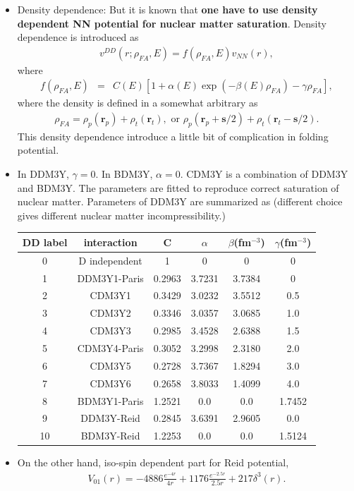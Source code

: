 \documentclass[11pt]{book}
\def\bm{\boldsymbol}
\def\vr{{\bm r}}
\newcommand{\bea}{\begin{eqnarray}}
\newcommand{\eea}{\end{eqnarray}}
\begin{document}
\begin{itemize}
	\item Density dependence: But it is known that {\bf one have to use density dependent NN potential for nuclear matter saturation}.
	Density dependence is introduced as 
	\bea 
	v^{DD}(r;\rho_{FA},E)= f(\rho_{FA},E) v_{NN}(r),
	\eea 
	where
	\bea 
	f(\rho_{FA},E)&=& C(E) \left[ 1+\alpha(E) \exp(-\beta(E) \rho_{FA})-\gamma \rho_{FA} \right],
	\eea  
	where the density is defined in a somewhat arbitrary as
	\bea 
	\rho_{FA} = \rho_{p}(\vr_p)+\rho_t(\vr_t),\mbox{ or } \rho_{p}(\vr_p+{\bm s}/2)+\rho_t(\vr_t-{\bm s}/2).
	\eea 
	This density dependence introduce a little bit of complication in folding potential. 
	\item In DDM3Y, $\gamma=0$. In BDM3Y, $\alpha=0$. CDM3Y is a combination of DDM3Y and BDM3Y. 
	 The parameters are fitted to reproduce correct saturation of nuclear matter. 
     Parameters of DDM3Y are summarized as (different choice gives different nuclear matter incompressibility.)
    
    \begin{tabular}{|c|c|c|c|c|c|}
    	\hline 
    	DD label & interaction & C & $\alpha$ & $\beta$(fm$^{-3}$) & $\gamma$(fm$^{-3}$) \\ 
    	\hline 
    	0 & D independent & 1 & 0 & 0 & 0 \\ 
    	\hline 
    	1 & DDM3Y1-Paris & 0.2963 & 3.7231 & 3.7384 & 0 \\ 
    	\hline 
    	2 & CDM3Y1 & 0.3429 & 3.0232 &  3.5512 &  0.5 \\ 
    	\hline 
    	3 & CDM3Y2 &  0.3346  & 3.0357  & 3.0685 &  1.0 \\ 
    	\hline 
    	4 & CDM3Y3 &  0.2985  & 3.4528  & 2.6388 &  1.5 \\ 
    	\hline 
    	5 & CDM3Y4-Paris &  0.3052  & 3.2998  & 2.3180 &  2.0 \\ 
    	\hline 
    	6 & CDM3Y5 &  0.2728  & 3.7367 &  1.8294 &  3.0 \\ 
    	\hline 
    	7 & CDM3Y6 &  0.2658  & 3.8033 &  1.4099  & 4.0 \\ 
    	\hline 
    	8 & BDM3Y1-Paris &  1.2521 &  0.0 &  0.0  & 1.7452
    	\\ 
    	\hline 
    	9 &DDM3Y-Reid & 0.2845 & 3.6391 & 2.9605 & 0.0 \\
    	\hline 
    	10 & BDM3Y-Reid & 1.2253 & 0.0 & 0.0 & 1.5124 \\
    	\hline 
    \end{tabular} 
    
	\item On the other hand, iso-spin dependent part for Reid potential,
	\bea
	V_{01}(r)= -4886 \frac{e^{-4 r}}{4r}+1176\frac{e^{-2.5r}}{2.5 r}+217\delta^3(r). 
	\eea 

\end{itemize}
\end{document}
